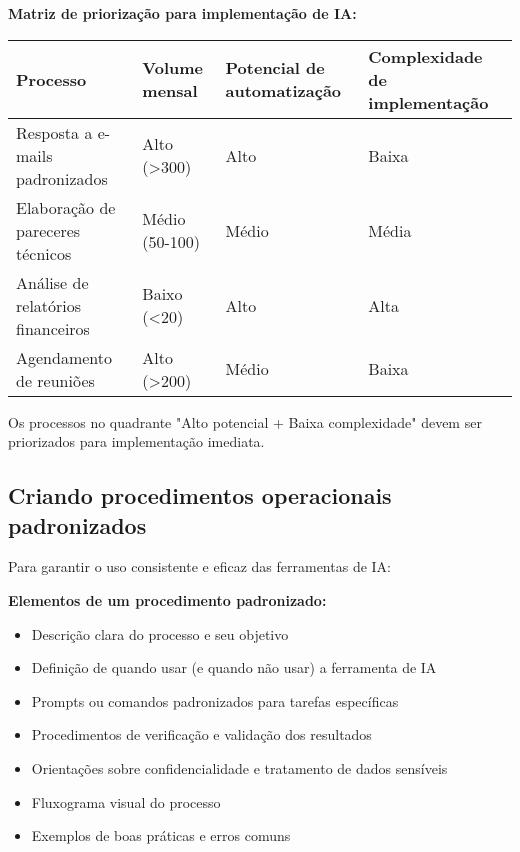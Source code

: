 \documentclass[12pt,a4paper]{book}
\begin{document}
\begin{tcolorbox}[exemplo]
\textbf{Matriz de priorização para implementação de IA:}

\begin{tabular}{|p{4cm}|p{3cm}|p{3cm}|p{3cm}|}
\hline
\textbf{Processo} & \textbf{Volume mensal} & \textbf{Potencial de automatização} & \textbf{Complexidade de implementação} \\
\hline
Resposta a e-mails padronizados & Alto (>300) & Alto & Baixa \\
\hline
Elaboração de pareceres técnicos & Médio (50-100) & Médio & Média \\
\hline
Análise de relatórios financeiros & Baixo (<20) & Alto & Alta \\
\hline
Agendamento de reuniões & Alto (>200) & Médio & Baixa \\
\hline
\end{tabular}

Os processos no quadrante "Alto potencial + Baixa complexidade" devem ser priorizados para implementação imediata.
\end{tcolorbox}

\subsection{Criando procedimentos operacionais padronizados}

Para garantir o uso consistente e eficaz das ferramentas de IA:

\textbf{Elementos de um procedimento padronizado:}
\begin{itemize}
    \item Descrição clara do processo e seu objetivo
    \item Definição de quando usar (e quando não usar) a ferramenta de IA
    \item Prompts ou comandos padronizados para tarefas específicas
    \item Procedimentos de verificação e validação dos resultados
    \item Orientações sobre confidencialidade e tratamento de dados sensíveis
    \item Fluxograma visual do processo
    \item Exemplos de boas práticas e erros comuns
\end{itemize}
\end{document}
